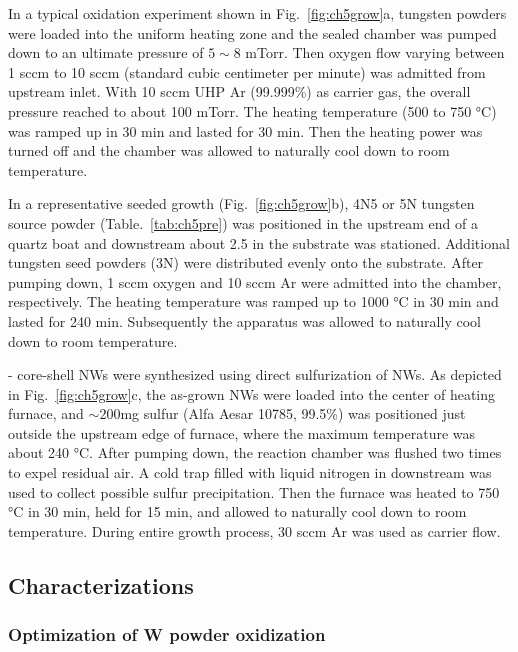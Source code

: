 In a typical oxidation experiment shown in Fig.~\ref{fig:ch5grow}a, tungsten powders were loaded into the uniform heating zone and the sealed chamber was pumped down to an ultimate pressure of $5\sim8$ mTorr. Then oxygen flow varying between 1 sccm to 10 sccm (standard cubic centimeter per minute) was admitted from upstream inlet. With 10 sccm UHP Ar (99.999\%) as carrier gas, the overall pressure reached to about 100 mTorr. The heating temperature (500 to 750 \si{\degreeCelsius}) was ramped up in 30 min and lasted for 30 min. Then the heating power was turned off and the chamber was allowed to naturally cool down to room temperature.

In a representative seeded growth (Fig.~\ref{fig:ch5grow}b), 4N5 or 5N tungsten source powder (Table.~\ref{tab:ch5pre}) was positioned in the upstream end of a quartz boat and downstream about 2.5 in the substrate was stationed. Additional tungsten seed powders (3N) were distributed evenly onto the substrate. After pumping down, 1 sccm oxygen and 10 sccm Ar were admitted into the chamber, respectively. The heating temperature was ramped up to 1000 \si{\degreeCelsius} in 30 min and lasted for 240 min. Subsequently the apparatus was allowed to naturally cool down to room temperature. 

- core-shell NWs were synthesized using direct sulfurization of  NWs. As depicted in Fig.~\ref{fig:ch5grow}c, the as-grown  NWs were loaded into the center of heating furnace, and $\sim200$mg sulfur (Alfa Aesar 10785, 99.5\%) was positioned just outside the upstream edge of furnace, where the maximum temperature was about 240 \si{\degreeCelsius}. After pumping down, the reaction chamber was flushed two times to expel residual air. A cold trap filled with liquid nitrogen in downstream was used to collect possible sulfur precipitation. Then the furnace was heated to 750 \si{\degreeCelsius} in 30 min, held for 15 min, and allowed to naturally cool down to room temperature. During entire growth process, 30 sccm Ar was used as carrier flow.


\subsection{Characterizations}

\subsubsection{Optimization of W powder oxidization}\label{sec:woxd}

